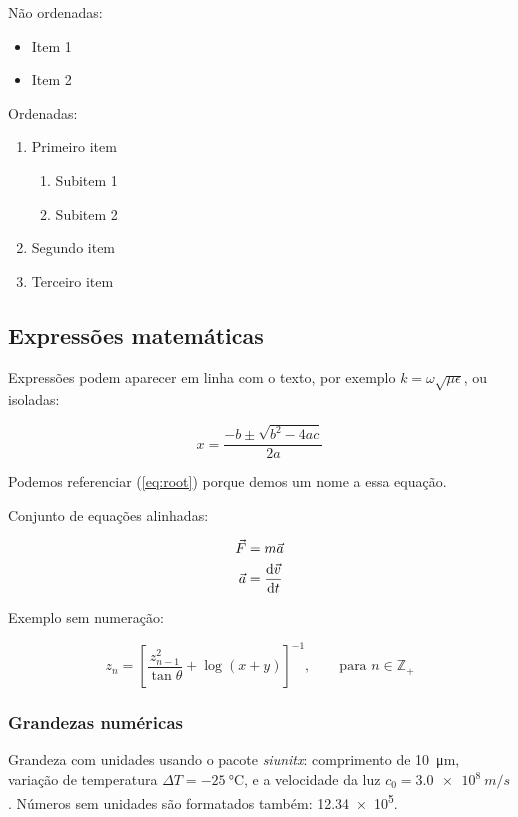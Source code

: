 \documentclass[a4paper,11pt]{article}
\begin{document}
Não ordenadas:

\begin{itemize}
	\item Item 1
	\item Item 2
\end{itemize}

Ordenadas:

\begin{enumerate}
	\item Primeiro item
	\begin{enumerate}
		\item Subitem 1
		\item Subitem 2
	\end{enumerate}
	\item Segundo item
	\item Terceiro item
\end{enumerate}

\subsection{Expressões matemáticas}

Expressões podem aparecer em linha com o texto, por exemplo $k = \omega \sqrt{\mu \epsilon}$, ou isoladas:

\begin{equation}
\label{eq:root}
x = \frac{-b \pm \sqrt{b^2 - 4ac}}{2a}
\end{equation}

Podemos referenciar (\ref{eq:root}) porque demos um nome a essa equação.

Conjunto de equações alinhadas:

\begin{align}
\vec{F} &= m \vec{a} \\
\vec{a} &= \frac{{\rm d}\vec{v}}{{\rm d}t}
\end{align}

Exemplo sem numeração:

\begin{equation*}
z_n = \left[\frac{z_{n-1}^2}{\tan\theta} + \log(x + y)\right]^{-1},\qquad\text{para } n \in \mathbb{Z}_+
\end{equation*}


\subsubsection{Grandezas numéricas}

Grandeza com unidades usando o pacote \emph{siunitx}: comprimento de \SI{10}{\micro m}, variação de temperatura $\Delta T = \SI{-25}{\celsius}$, e a velocidade da luz $c_0 = \SI{3.0e8}{m/s}$.
Números sem unidades são formatados também: \num{12.34e5}.
\end{document}
